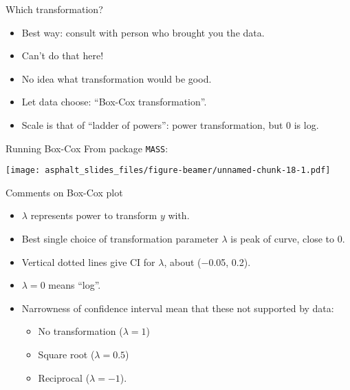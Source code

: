 \begin{frame}{Which transformation?}
\protect\hypertarget{which-transformation}{}
\begin{itemize}
\tightlist
\item
  Best way: consult with person who brought you the data.
\item
  Can't do that here!
\item
  No idea what transformation would be good.
\item
  Let data choose: ``Box-Cox transformation''.
\item
  Scale is that of ``ladder of powers'': power transformation, but 0 is
  log.
\end{itemize}
\end{frame}

\begin{frame}[fragile]{Running Box-Cox}
\protect\hypertarget{running-box-cox}{}
From package \texttt{MASS}:

\begin{Shaded}
\begin{Highlighting}[]
\OperatorTok{\textasciitilde{}}\StringTok{ }\OperatorTok{+}\StringTok{ }\OperatorTok{+}\StringTok{ }\OperatorTok{+}\StringTok{ }\OperatorTok{+}
\StringTok{  }\OperatorTok{+}\StringTok{ }
\end{Highlighting}
\end{Shaded}

\texttt{[image: asphalt\_slides\_files/figure-beamer/unnamed-chunk-18-1.pdf]}
\end{frame}

\begin{frame}{Comments on Box-Cox plot}
\protect\hypertarget{comments-on-box-cox-plot}{}
\begin{itemize}
\tightlist
\item
  \(\lambda\) represents power to transform \(y\) with.
\item
  Best single choice of transformation parameter \(\lambda\) is peak of
  curve, close to 0.
\item
  Vertical dotted lines give CI for \(\lambda\), about (−0.05, 0.2).
\item
  \(\lambda = 0\) means ``log''.
\item
  Narrowness of confidence interval mean that these not supported by
  data:

  \begin{itemize}
  \tightlist
  \item
    No transformation (\(\lambda = 1\))
  \item
    Square root (\(\lambda = 0.5\))
  \item
    Reciprocal (\(\lambda = −1\)).
  \end{itemize}
\end{itemize}
\end{frame}

